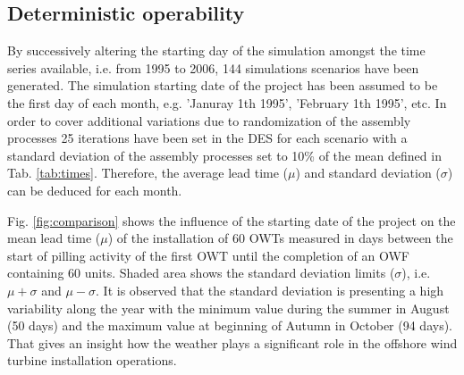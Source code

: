 \subsection{Deterministic operability}
By successively altering the starting day of the simulation amongst the time series available, i.e. from 1995 to 2006, 144 simulations scenarios have been generated. The simulation starting date of the project has been assumed to be the first day of each month, e.g. 'Januray 1th 1995', 'February 1th 1995', etc. In order to cover additional variations due to randomization of the assembly processes 25 iterations have been set in the DES for each scenario with a standard deviation of the assembly processes set to 10\% of the mean defined in Tab. \ref{tab:times}. Therefore, the average lead time ($\mu$) and standard deviation ($\sigma$) can be deduced for each month.

Fig. \ref{fig:comparison} shows the influence of the starting date of the project on the mean lead time ($\mu$) of the installation of 60 OWTs measured in days between the start of pilling activity of the first OWT until the completion of an OWF containing 60 units. Shaded area shows the standard deviation limits ($\sigma$), i.e. $\mu + \sigma$ and $\mu - \sigma$. It is observed that the standard deviation is presenting a high variability along the year with the minimum value during the summer in August (50 days) and the maximum value at beginning of Autumn in October (94 days). That gives an insight how the weather plays a significant role in the offshore wind turbine installation operations.